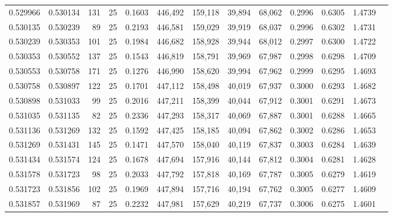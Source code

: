 \begin{tabular}{rrrrrrrrrrrrr}
0.529966 & 0.530134 &   131 &  25 &                                     0.1603 & 446,492 & 159,118 &  39,894 &  68,062 & 0.2996 & 0.6305 & 1.4739 \\
0.530135 & 0.530239 &    89 &  25 &                                     0.2193 & 446,581 & 159,029 &  39,919 &  68,037 & 0.2996 & 0.6302 & 1.4731 \\
0.530239 & 0.530353 &   101 &  25 &                                     0.1984 & 446,682 & 158,928 &  39,944 &  68,012 & 0.2997 & 0.6300 & 1.4722 \\
0.530353 & 0.530552 &   137 &  25 &                                     0.1543 & 446,819 & 158,791 &  39,969 &  67,987 & 0.2998 & 0.6298 & 1.4709 \\
0.530553 & 0.530758 &   171 &  25 &                                     0.1276 & 446,990 & 158,620 &  39,994 &  67,962 & 0.2999 & 0.6295 & 1.4693 \\
0.530758 & 0.530897 &   122 &  25 &                                     0.1701 & 447,112 & 158,498 &  40,019 &  67,937 & 0.3000 & 0.6293 & 1.4682 \\
0.530898 & 0.531033 &    99 &  25 &                                     0.2016 & 447,211 & 158,399 &  40,044 &  67,912 & 0.3001 & 0.6291 & 1.4673 \\
0.531035 & 0.531135 &    82 &  25 &                                     0.2336 & 447,293 & 158,317 &  40,069 &  67,887 & 0.3001 & 0.6288 & 1.4665 \\
0.531136 & 0.531269 &   132 &  25 &                                     0.1592 & 447,425 & 158,185 &  40,094 &  67,862 & 0.3002 & 0.6286 & 1.4653 \\
0.531269 & 0.531431 &   145 &  25 &                                     0.1471 & 447,570 & 158,040 &  40,119 &  67,837 & 0.3003 & 0.6284 & 1.4639 \\
0.531434 & 0.531574 &   124 &  25 &                                     0.1678 & 447,694 & 157,916 &  40,144 &  67,812 & 0.3004 & 0.6281 & 1.4628 \\
0.531578 & 0.531723 &    98 &  25 &                                     0.2033 & 447,792 & 157,818 &  40,169 &  67,787 & 0.3005 & 0.6279 & 1.4619 \\
0.531723 & 0.531856 &   102 &  25 &                                     0.1969 & 447,894 & 157,716 &  40,194 &  67,762 & 0.3005 & 0.6277 & 1.4609 \\
0.531857 & 0.531969 &    87 &  25 &                                     0.2232 & 447,981 & 157,629 &  40,219 &  67,737 & 0.3006 & 0.6275 & 1.4601 \\

\end{tabular}
